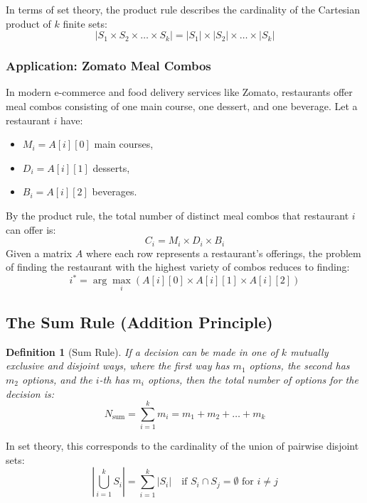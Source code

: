 \documentclass[10pt,journal,compsoc,onecolumn]{IEEEtran}
\newtheorem{definition}[theorem]{Definition}
\begin{document}
In terms of set theory, the product rule describes the cardinality of the Cartesian product of $k$ finite sets:
\[
|S_1 \times S_2 \times \dots \times S_k| = |S_1| \times |S_2| \times \dots \times |S_k|
\]

\subsubsection{Application: Zomato Meal Combos}
In modern e-commerce and food delivery services like Zomato, restaurants offer meal combos consisting of one main course, one dessert, and one beverage. Let a restaurant $i$ have:
\begin{itemize}
    \item $M_i = A[i][0]$ main courses,
    \item $D_i = A[i][1]$ desserts,
    \item $B_i = A[i][2]$ beverages.
\end{itemize}
By the product rule, the total number of distinct meal combos that restaurant $i$ can offer is:
\[
C_i = M_i \times D_i \times B_i
\]
Given a matrix $A$ where each row represents a restaurant's offerings, the problem of finding the restaurant with the highest variety of combos reduces to finding:
\[
i^* = \arg\max_{i} \left( A[i][0] \times A[i][1] \times A[i][2] \right)
\]

\subsection{The Sum Rule (Addition Principle)}
\begin{definition}[Sum Rule]
If a decision can be made in one of $k$ mutually exclusive and disjoint ways, where the first way has $m_1$ options, the second has $m_2$ options, and the $i$-th has $m_i$ options, then the total number of options for the decision is:
\[
N_{\text{sum}} = \sum_{i=1}^{k} m_i = m_1 + m_2 + \dots + m_k
\]
\end{definition}

In set theory, this corresponds to the cardinality of the union of pairwise disjoint sets:
\[
\left| \bigcup_{i=1}^k S_i \right| = \sum_{i=1}^k |S_i| \quad \text{if } S_i \cap S_j = \emptyset \text{ for } i \neq j
\]
\end{document}
